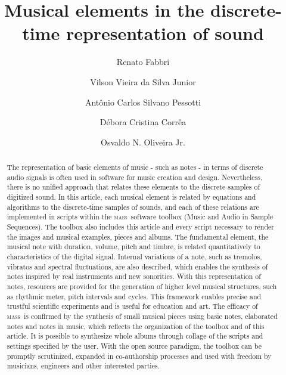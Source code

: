 \documentclass[format=acmsmall, review=false, screen=true]{acmart}
\newcommand{\massa}{{\large \textsc{mass}}}
\begin{document}
\title[Music in digital audio]{Musical elements in the discrete-time representation of sound}  
\author{Renato Fabbri}
\author{Vilson Vieira da Silva Junior}
\author{Ant\^onio Carlos Silvano Pessotti}
\author{D\'ebora Cristina Corr\^ea}
\author{Osvaldo N. Oliveira Jr.}

\begin{abstract}
The representation of basic elements of music - such as notes - in terms of discrete audio
signals is often used in software for music creation and design.
Nevertheless, there is no unified approach that relates these elements to the discrete samples of digitized sound.
In this article, each musical element is related by equations and algorithms to the discrete-time samples of sounds,
and each of these relations are implemented in scripts within the
    \massa\ software toolbox
 (Music and Audio in Sample Sequences).
The toolbox also includes this article and every script necessary to render the images
and musical examples, pieces and albums.
The fundamental element, the musical note with duration, volume, pitch and timbre,
is related quantitatively to characteristics of the digital signal.
Internal variations of a note, such as tremolos, vibratos and spectral fluctuations,
are also described, which enables the synthesis of notes inspired by real instruments and new sonorities.
With this representation of notes, resources are provided for the
    generation of higher level musical structures,
such as rhythmic meter, pitch intervals and cycles.
This framework enables precise and trustful scientific experiments and is useful for education and art.
The efficacy of \massa\ is confirmed by the synthesis of small musical pieces using basic notes,
elaborated notes and notes in music, which reflects the organization of the toolbox and of this article.
It is possible to synthesize whole albums through collage of the scripts and settings specified by the user.
With the open source paradigm, the toolbox can be promptly scrutinized,
expanded in co-authorship processes and used with freedom by musicians, engineers and other interested parties.
\end{abstract}
\end{document}
